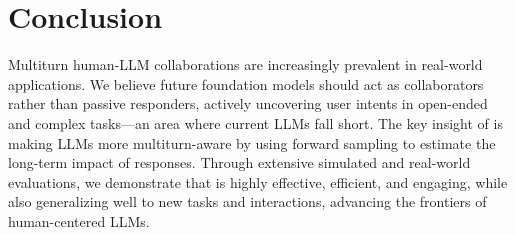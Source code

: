 
\section{Conclusion}
Multiturn human-LLM collaborations are increasingly prevalent in real-world applications. We believe future foundation models should act as collaborators rather than passive responders, actively uncovering user intents in open-ended and complex tasks---an area where current LLMs fall short. The key insight of \name{} is making LLMs more multiturn-aware by using forward sampling to estimate the long-term impact of responses. Through extensive simulated and real-world evaluations, we demonstrate that \name{} is highly effective, efficient, and engaging, while also generalizing well to new tasks and interactions, advancing the frontiers of human-centered LLMs.

